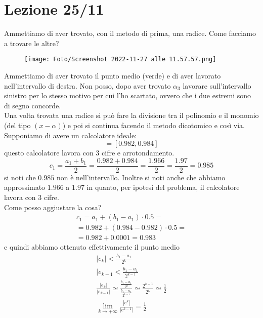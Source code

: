 \documentclass[a4paper, portrait]{book}
\numberwithin{equation}{chapter} %
\begin{document}
\chapter{Lezione 25/11}
Ammettiamo di aver trovato, con il metodo di prima, una radice. Come facciamo a trovare le altre?
\begin{figure}[h!]
    \centering
    \texttt{[image: Foto/Screenshot 2022-11-27 alle 11.57.57.png]}
    \caption{}
\end{figure}
Ammettiamo di aver trovato il punto medio (verde) e di aver lavorato nell'intervallo di destra. Non posso, dopo aver trovato $\alpha_3$ lavorare sull'intervallo sinistro per lo stesso motivo per cui l'ho scartato, ovvero che i due estremi sono di segno concorde.\\
Una volta trovata una radice si può fare la divisione tra il polinomio e il monomio (del tipo $(x-\alpha)$) e poi si continua facendo il metodo dicotomico e così via.\\
Supponiamo di avere un calcolatore ideale:
\begin{equation}
    [a_1,b_1] = [0.982, 0.984]
\end{equation}
questo calcolatore lavora con 3 cifre e arrotondamento.
\begin{equation}
    c_1 = \frac{a_1 + b_1}{2} = \frac{0.982 + 0.984}{2} = \frac{1.966}{2} = \frac{1.97}{2} = 0.985
\end{equation}
si noti che $0.985$ non è nell'intervallo. Inoltre si noti anche che abbiamo approssimato $1.966$ a $1.97$ in quanto, per ipotesi del problema, il calcolatore lavora con 3 cifre.\\
Come posso aggiustare la cosa?\\
\begin{gather}
    c_1 = a_1 + (b_1 - a_1) \cdot 0.5 = \\
    = 0.982 + (0.984 - 0.982) \cdot 0.5 = \\
    = 0.982 + 0.0001 = 0.983
\end{gather}
e quindi abbiamo ottenuto effettivamente il punto medio
\begin{gather}
    |e_k| < \frac{b_1 - a_1}{2^k}\\
    |e_{k-1} < \frac{b_1 - a_1}{2^{k-1}}\\
    \frac{|e_k|}{|e_{k-1}|} \simeq \frac{\frac{b_1 - a_1}{2^k}}{\frac{b_1 - a_1}{2^{k-1}}} \simeq \frac{2^{k-1}}{2^k}\simeq \frac{1}{2}\\
    \lim_{k\rightarrow +\infty} \frac{|e^k|}{|e^{k-1}|} = \frac{1}{2}
\end{gather}
\end{document}
